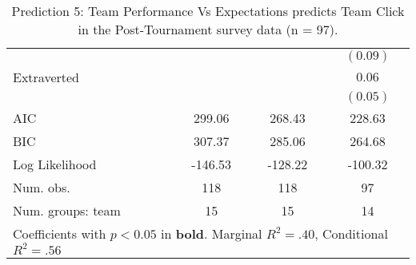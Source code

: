 \begin{table}
\begin{center}
\begin{tabular}{l c c c }
                                           &          &                       & $(0.09)$              \\
Extraverted                                &          &                       & $0.06$                \\
                                           &          &                       & $(0.05)$              \\
\midrule
AIC                                        & 299.06   & 268.43                & 228.63                \\
BIC                                        & 307.37   & 285.06                & 264.68                \\
Log Likelihood                             & -146.53  & -128.22               & -100.32               \\
Num. obs.                                  & 118      & 118                   & 97                    \\
Num. groups: team                          & 15       & 15                    & 14                    \\
\bottomrule
\multicolumn{4}{l}{\scriptsize{Coefficients with $p < 0.05$ in \textbf{bold}. Marginal $R^2 = .40$, Conditional $R^2 = .56$}}
\end{tabular}
\caption{Prediction 5: Team Performance Vs Expectations predicts Team Click in the Post-Tournament survey data (n = 97).}
\label{tab:MLM1bteamExpectationsClick}
\end{center}
\end{table}
